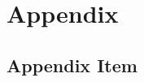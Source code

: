 \section*{Appendix}

\renewcommand{\thesubsection}{\Alph{subsection}}
\renewcommand{\thefigure}{\Alph{subsection}.\arabic{figure}}

\subsection{Appendix Item}

\clearpage
